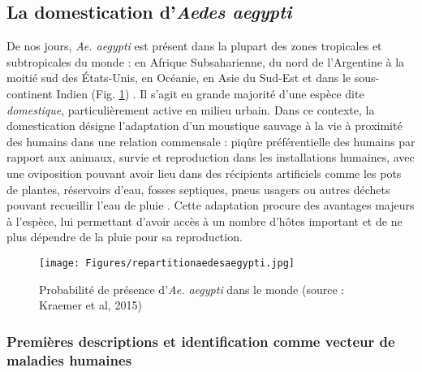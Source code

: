  
\subsection{La domestication d'{\em Aedes aegypti}}

De nos jours, {\em Ae. aegypti} est présent dans la plupart des zones tropicales et subtropicales du monde : en Afrique Subsaharienne, du nord de l'Argentine à la moitié sud des États-Unis, en Océanie, en Asie du Sud-Est et dans le sous-continent Indien (Fig. \ref{fig:repartitionaedesaegypti}) \cite{kraemer2015global}.
Il s'agit en grande majorité d'une espèce dite {\em domestique}, particulièrement active en milieu urbain.
Dans ce contexte, la domestication désigne l'adaptation d'un moustique sauvage à la vie à proximité des humains dans une relation commensale : piqûre préférentielle des humains par rapport aux animaux, survie et reproduction dans les installations humaines, avec une oviposition pouvant avoir lieu dans des récipients artificiels comme les pots de plantes, réservoirs d'eau, fosses septiques, pneus usagers ou autres déchets pouvant recueillir l'eau de pluie  \cite{christophers1960aedes}.
Cette adaptation procure des avantages majeurs à l'espèce, lui permettant d'avoir accès à un nombre  d'hôtes important et de ne plus dépendre de la pluie pour sa reproduction.


\begin{figure}[h]
	\centering
	\texttt{[image: Figures/repartitionaedesaegypti.jpg]}
	\caption{Probabilité de présence d'{\em Ae. aegypti} dans le monde (source : Kraemer et al, 2015)}
	\label{fig:repartitionaedesaegypti}
\end{figure}


\subsubsection{Premières descriptions et identification comme vecteur de maladies humaines}


